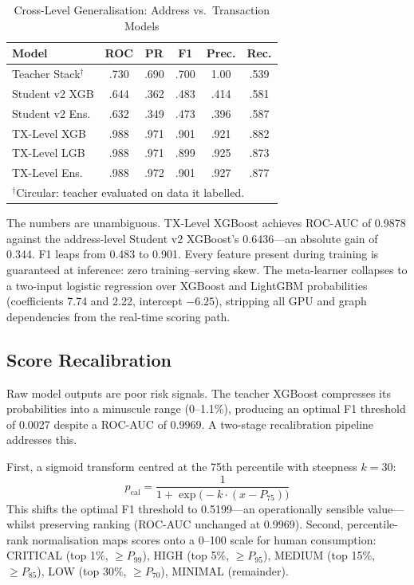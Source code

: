 \documentclass[journal]{IEEEtran}
\begin{document}
\begin{table}[!t]
\centering
\caption{Cross-Level Generalisation: Address vs.\ Transaction Models}
\label{tab:crosslevel}
\begin{tabular}{lccccc}
\toprule
\textbf{Model} & \textbf{ROC} & \textbf{PR} & \textbf{F1} & \textbf{Prec.} & \textbf{Rec.} \\
\midrule
Teacher Stack$^\dagger$ & .730 & .690 & .700 & 1.00 & .539 \\
Student v2 XGB         & .644 & .362 & .483 & .414 & .581 \\
Student v2 Ens.        & .632 & .349 & .473 & .396 & .587 \\
TX-Level XGB           & .988 & .971 & .901 & .921 & .882 \\
TX-Level LGB           & .988 & .971 & .899 & .925 & .873 \\
TX-Level Ens.          & .988 & .972 & .901 & .927 & .877 \\
\bottomrule
\multicolumn{6}{l}{\footnotesize $^\dagger$Circular: teacher evaluated on data it labelled.}
\end{tabular}
\end{table}

The numbers are unambiguous. TX-Level XGBoost achieves ROC-AUC of 0.9878 against the address-level Student v2 XGBoost's 0.6436---an absolute gain of 0.344. F1 leaps from 0.483 to 0.901. Every feature present during training is guaranteed at inference: zero training--serving skew. The meta-learner collapses to a two-input logistic regression over XGBoost and LightGBM probabilities (coefficients 7.74 and 2.22, intercept $-6.25$), stripping all GPU and graph dependencies from the real-time scoring path.

\subsection{Score Recalibration}

Raw model outputs are poor risk signals. The teacher XGBoost compresses its probabilities into a minuscule range (0--1.1\%), producing an optimal F1 threshold of 0.0027 despite a ROC-AUC of 0.9969. A two-stage recalibration pipeline addresses this.

First, a sigmoid transform centred at the 75th percentile with steepness $k = 30$:
\begin{equation}
p_{\mathrm{cal}} = \frac{1}{1 + \exp\bigl(-k \cdot (x - P_{75})\bigr)}
\label{eq:recal}
\end{equation}
This shifts the optimal F1 threshold to 0.5199---an operationally sensible value---whilst preserving ranking (ROC-AUC unchanged at 0.9969). Second, percentile-rank normalisation maps scores onto a 0--100 scale for human consumption: CRITICAL (top 1\%, $\ge P_{99}$), HIGH (top 5\%, $\ge P_{95}$), MEDIUM (top 15\%, $\ge P_{85}$), LOW (top 30\%, $\ge P_{70}$), MINIMAL (remainder).
\end{document}
